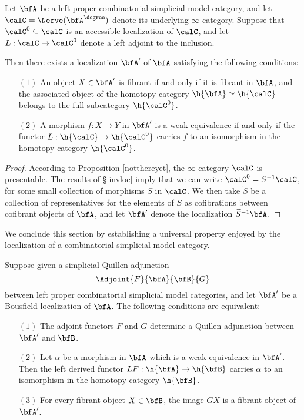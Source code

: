 \begin{proposition}\label{cabber}
Let $\bfA$ be a left proper combinatorial simplicial model category, and let
$\calC = \Nerve( \bfA^{\degree} )$ denote its underlying $\infty$-category.
Suppose that $\calC^{0} \subseteq \calC$ is an accessible localization of $\calC$, and let
$L: \calC \rightarrow \calC^{0}$ denote a left adjoint to the inclusion.

Then there exists a localization $\bfA'$ of $\bfA$ satisfying the following conditions:
\begin{itemize}
\item[$(1)$] An object $X \in \bfA'$ is fibrant if and only if it is fibrant in $\bfA$, and
the associated object of the homotopy category $\h{ \bfA} \simeq \h{ \calC}$ belongs to the full subcategory $\h{ \calC^{0}}$. 
\item[$(2)$] A morphism $f: X \rightarrow Y$ in $\bfA'$ is a weak equivalence if and only if
the functor $L: \h{ \calC} \rightarrow \h{ \calC^{0} }$ carries $f$ to an isomorphism in the homotopy category $\h{ \calC^{0} }$.
\end{itemize}
\end{proposition}

\begin{proof}
According to Proposition \ref{notthereyet}, the $\infty$-category $\calC$ is presentable. 
The results of \S \ref{invloc} imply that we can write $\calC^{0} = S^{-1} \calC$, for some
small collection of morphisms $S$ in $\calC$. We then take $\widetilde{S}$ be a collection of representatives for the elements of $S$ as cofibrations between cofibrant objects of $\bfA$, and let
$\bfA'$ denote the localization $\widetilde{S}^{-1} \bfA$. 
\end{proof}

We conclude this section by establishing a universal property enjoyed by the localization of a combinatorial simplicial model category.

\begin{proposition}\label{stake}
Suppose given a simplicial Quillen adjunction
$$ \Adjoint{F}{\bfA}{\bfB}{G}$$
between left proper combinatorial simplicial model categories, and let $\bfA'$ be a Bousfield localization of $\bfA$. The following conditions are equivalent:
\begin{itemize}
\item[$(1)$] The adjoint functors $F$ and $G$ determine a Quillen adjunction between
$\bfA'$ and $\bfB$.
\item[$(2)$] Let $\alpha$ be a morphism in $\bfA$ which is a weak equivalence in
$\bfA'$. Then the left derived functor $LF: \h{\bfA} \rightarrow \h{\bfB}$ carries
$\alpha$ to an isomorphism in the homotopy category $\h{\bfB}$.
\item[$(3)$] For every fibrant object $X \in \bfB$, the image $GX$ is a fibrant object of $\bfA'$.
\end{itemize}
\end{proposition}

